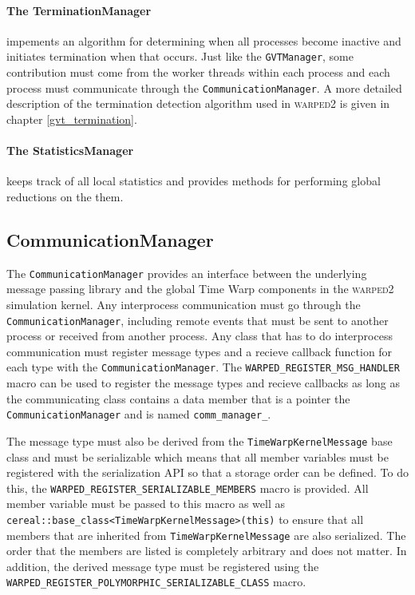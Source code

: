 \documentclass[11pt]{book}
\begin{document}
\paragraph{The TerminationManager} impements an algorithm for determining when all processes
become inactive and initiates termination when that occurs.  Just like the \texttt{GVTManager},
some contribution must come from the worker threads within each process and each process must
communicate through the \texttt{CommunicationManager}.  A more detailed description of the
termination detection algorithm used in \textsc{warped2} is given in chapter \ref{gvt_termination}.

\paragraph{The StatisticsManager} keeps track of all local statistics and provides methods for
performing global reductions on the them.  

\subsection{CommunicationManager}

The \texttt{CommunicationManager} provides an interface between the underlying message passing library
and the global Time Warp components in the \textsc{warped2} simulation kernel.  Any interprocess
communication must go through the \texttt{CommunicationManager}, including remote events that must be
sent to another process or received from another process.  Any class that has to do interprocess
communication must register message types and a recieve callback function for each type with
the \texttt{CommunicationManager}.  The \texttt{WARPED\_REGISTER\_MSG\_HANDLER} macro can be used
to register the message types and recieve callbacks as long as the communicating class contains
a data member that is a pointer the \texttt{CommunicationManager} and is named \texttt{comm\_manager\_}.

The message type must also be derived from the \texttt{TimeWarpKernelMessage} base class and
must be serializable which means that all member variables must be registered with the serialization
API so that a storage order can be defined.  To do this, the \texttt{WARPED\_REGISTER\_SERIALIZABLE\_MEMBERS}
macro is provided.  All member variable must be passed to this macro as well as
\texttt{cereal::base\_class<TimeWarpKernelMessage>(this)} to ensure that all members that are
inherited from \texttt{TimeWarpKernelMessage} are also serialized.  The order that the members are
listed is completely arbitrary and does not matter.  In addition, the derived message type must
be registered using the \texttt{WARPED\_REGISTER\_POLYMORPHIC\_SERIALIZABLE\_CLASS} macro.  
\end{document}
